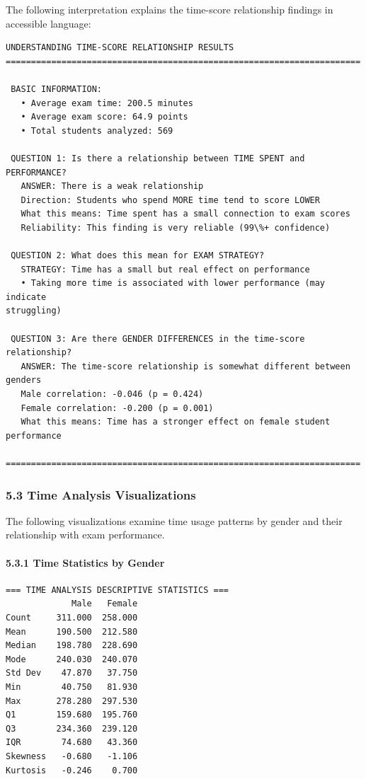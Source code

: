 \documentclass[11pt]{article}
\begin{document}
The following interpretation explains the time-score relationship
findings in accessible language:

    \begin{Verbatim}[commandchars=\\\{\}]
UNDERSTANDING TIME-SCORE RELATIONSHIP RESULTS
======================================================================

 BASIC INFORMATION:
   • Average exam time: 200.5 minutes
   • Average exam score: 64.9 points
   • Total students analyzed: 569

 QUESTION 1: Is there a relationship between TIME SPENT and PERFORMANCE?
   ANSWER: There is a weak relationship
   Direction: Students who spend MORE time tend to score LOWER
   What this means: Time spent has a small connection to exam scores
   Reliability: This finding is very reliable (99\%+ confidence)

 QUESTION 2: What does this mean for EXAM STRATEGY?
   STRATEGY: Time has a small but real effect on performance
   • Taking more time is associated with lower performance (may indicate
struggling)

 QUESTION 3: Are there GENDER DIFFERENCES in the time-score relationship?
   ANSWER: The time-score relationship is somewhat different between genders
   Male correlation: -0.046 (p = 0.424)
   Female correlation: -0.200 (p = 0.001)
   What this means: Time has a stronger effect on female student performance

======================================================================
    \end{Verbatim}

    \subsubsection{5.3 Time Analysis
Visualizations}\label{time-analysis-visualizations}

The following visualizations examine time usage patterns by gender and
their relationship with exam performance.

    \paragraph{5.3.1 Time Statistics by
Gender}\label{time-statistics-by-gender}

    \begin{Verbatim}[commandchars=\\\{\}]
=== TIME ANALYSIS DESCRIPTIVE STATISTICS ===
             Male   Female
Count     311.000  258.000
Mean      190.500  212.580
Median    198.780  228.690
Mode      240.030  240.070
Std Dev    47.870   37.750
Min        40.750   81.930
Max       278.280  297.530
Q1        159.680  195.760
Q3        234.360  239.120
IQR        74.680   43.360
Skewness   -0.680   -1.106
Kurtosis   -0.246    0.700
    \end{Verbatim}
\end{document}

